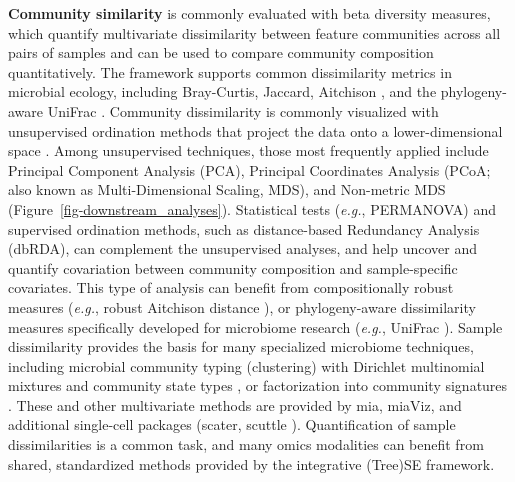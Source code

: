 \documentclass[
  sn-nature,
]{sn-jnl}
\begin{document}
\textbf{Community similarity} is commonly evaluated with beta diversity
measures, which quantify multivariate dissimilarity between feature
communities across all pairs of samples and can be used to compare
community composition quantitatively. The framework supports common
dissimilarity metrics in microbial ecology, including Bray-Curtis,
Jaccard, Aitchison \citep{bastiaanssen_bugs1_2023, martino2019}, and the
phylogeny-aware UniFrac \citep{lozupone2005}. Community dissimilarity is
commonly visualized with unsupervised ordination methods that project
the data onto a lower-dimensional space \citep{goodrich2014}. Among
unsupervised techniques, those most frequently applied include Principal
Component Analysis (PCA), Principal Coordinates Analysis (PCoA; also
known as Multi-Dimensional Scaling, MDS), and Non-metric MDS
(Figure~\ref{fig-downstream_analyses}). Statistical tests (\emph{e.g.},
PERMANOVA) and supervised ordination methods, such as distance-based
Redundancy Analysis (dbRDA), can complement the unsupervised analyses,
and help uncover and quantify covariation between community composition
and sample-specific covariates. This type of analysis can benefit from
compositionally robust measures (\emph{e.g.}, robust Aitchison distance
\citep{martino2019}), or phylogeny-aware dissimilarity measures
specifically developed for microbiome research (\emph{e.g.}, UniFrac
\citep{lozupone2005}). Sample dissimilarity provides the basis for many
specialized microbiome techniques, including microbial community typing
(clustering) with Dirichlet multinomial mixtures \citep{holmes2012} and
community state types \citep{digiulio2015}, or factorization into
community signatures \citep{frioux2023}. These and other multivariate
methods are provided by mia, miaViz, and additional single-cell packages
(scater, scuttle \citep{amezquita2020}). Quantification of sample
dissimilarities is a common task, and many omics modalities can benefit
from shared, standardized methods provided by the integrative (Tree)SE
framework.
\end{document}
